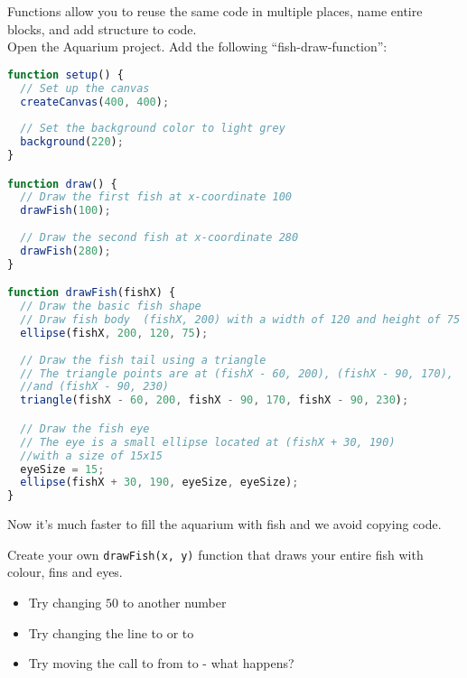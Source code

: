 
\newpage
{}

\begin{exercisebox}[adjusted title=Functions]
Functions allow you to reuse the same code in multiple places,
name entire blocks, and add structure to code.\\

Open the Aquarium project. Add the following ``fish-draw-function'':

\begin{lstlisting}[language=JavaScript]
function setup() {
  // Set up the canvas
  createCanvas(400, 400);
  
  // Set the background color to light grey
  background(220);
}

function draw() {
  // Draw the first fish at x-coordinate 100
  drawFish(100);
  
  // Draw the second fish at x-coordinate 280
  drawFish(280);
}

function drawFish(fishX) {
  // Draw the basic fish shape
  // Draw fish body  (fishX, 200) with a width of 120 and height of 75
  ellipse(fishX, 200, 120, 75);
  
  // Draw the fish tail using a triangle
  // The triangle points are at (fishX - 60, 200), (fishX - 90, 170), 
  //and (fishX - 90, 230)
  triangle(fishX - 60, 200, fishX - 90, 170, fishX - 90, 230);

  // Draw the fish eye
  // The eye is a small ellipse located at (fishX + 30, 190) 
  //with a size of 15x15
  eyeSize = 15;
  ellipse(fishX + 30, 190, eyeSize, eyeSize);
}

\end{lstlisting}

Now it's much faster to fill the aquarium with fish and we avoid copying code.

 Create your own \texttt{drawFish(x, y)} function that draws your entire fish with colour, fins and eyes.

\end{exercisebox}

\begin{exercisebox}[adjusted title=Notes and Extra]
\begin{itemize}
\item Try changing $50$ to another number
\item Try changing the line  to  or to 
\item Try moving the call to  from 
 to  - what happens?
\end{itemize}

\end{exercisebox}

